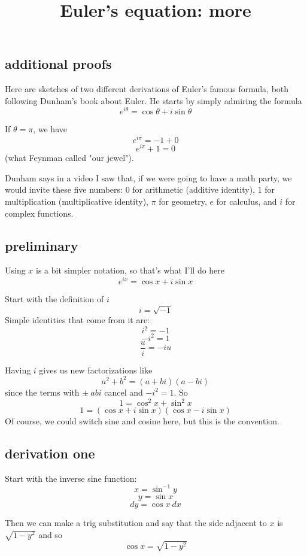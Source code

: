 \documentclass[11pt, oneside]{article}
\title{Euler's equation:  more}
\date{}
\begin{document}
\maketitle
\Large


\label{sec:Euler's_equation}

\subsection*{additional proofs}
Here are sketches of two different derivations of Euler's famous formula, both following Dunham's book about Euler.  He starts by simply admiring the formula
\[ e^{i\theta} = \cos \theta + i \sin \theta \]

If $\theta = \pi$, we have
\[ e^{i\pi} = -1 + 0 \]
\[ e^{i\pi}+ 1 = 0 \]
(what Feynman called "our jewel").

Dunham says in a video I saw that, if we were going to have a math party, we would invite these five numbers:  $0$ for arithmetic (additive identity), $1$ for multiplication (multiplicative identity), $\pi$ for geometry, $e$ for calculus, and $i$ for complex functions.

\subsection*{preliminary}
Using $x$ is a bit simpler notation, so that's what I'll do here
\[ e^{ix} = \cos x + i \sin x \]

Start with the definition of $i$
\[ i = \sqrt{-1} \]
Simple identities that come from it are:
\[ i^2 = - 1 \]
\[ -i^2 = 1 \]
\[ \frac{u}{i} = - i u \]

Having $i$ gives us new factorizations like
\[ a^2 + b^2 = (a + bi)(a - bi) \]
since the terms with $\pm \ abi$ cancel and $- i^2 = 1$.  
So
\[ 1 = \cos^2 x + \sin^2 x \]
\[ 1 = (\cos x + i \sin x) (\cos x - i \sin x) \]
Of course, we could switch sine and cosine here, but this is the convention.

\subsection*{derivation one}
Start with the inverse sine function:
\[ x = \sin^{-1} y \]
\[ y = \sin x \]
\[ dy = \cos x \ dx \]

Then we can make a trig substitution and say that the side adjacent to $x$ is $\sqrt{1-y^2}$ and so
\[ \cos x = \sqrt{1-y^2} \]
\end{document}
